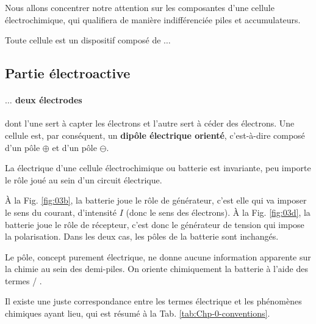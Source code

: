 Nous allons concentrer notre attention sur les composantes d'une cellule électrochimique, qui qualifiera de manière indifférenciée piles et accumulateurs.

Toute cellule est un dispositif composé de $\ldots$

\subsection{Partie électroactive}

\paragraph*{$\ldots$ deux électrodes} dont l'une sert à capter les électrons et l'autre sert à céder des électrons. Une cellule est, par conséquent, un \textbf{dipôle électrique orienté}, c'est-à-dire composé d'un pôle $\oplus$ et d'un pôle $\ominus$.

La  électrique d'une cellule électrochimique ou batterie est invariante, peu importe le rôle joué au sein d'un circuit électrique.

\`{A} la Fig. \ref{fig:03b}, la batterie joue le rôle de générateur, c'est elle qui va imposer le sens du courant, d'intensité $I$ (donc le sens des électrons). \`{A} la Fig. \ref{fig:03d}, la batterie joue le rôle de récepteur, c'est donc le générateur de tension qui impose la polarisation. Dans les deux cas, les pôles de la batterie sont inchangés. 

Le pôle, concept purement électrique, ne donne aucune information apparente sur la chimie au sein des demi-piles. On oriente chimiquement la batterie à l'aide des termes  / .


Il existe une juste correspondance entre les termes électrique et les phénomènes chimiques ayant lieu, qui est résumé à la Tab. \ref{tab:Chp-0-conventions}.


